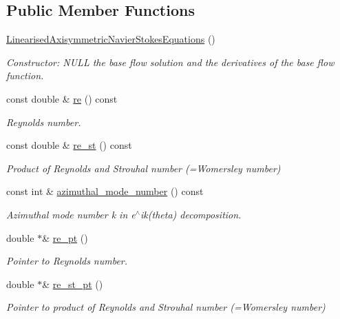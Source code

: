 \subsection*{Public Member Functions}
\begin{DoxyCompactItemize}
\item 
\hyperlink{classoomph_1_1LinearisedAxisymmetricNavierStokesEquations_af5e187cebf7b218c452eeaef0514abfb}{Linearised\+Axisymmetric\+Navier\+Stokes\+Equations} ()
\begin{DoxyCompactList}\small\item\em Constructor\+: N\+U\+LL the base flow solution and the derivatives of the base flow function. \end{DoxyCompactList}\item 
const double \& \hyperlink{classoomph_1_1LinearisedAxisymmetricNavierStokesEquations_a6cbc29fea3dd2d94d546ba123976599d}{re} () const
\begin{DoxyCompactList}\small\item\em Reynolds number. \end{DoxyCompactList}\item 
const double \& \hyperlink{classoomph_1_1LinearisedAxisymmetricNavierStokesEquations_a57172dbe008a3b6889397c64fa9e5172}{re\+\_\+st} () const
\begin{DoxyCompactList}\small\item\em Product of Reynolds and Strouhal number (=Womersley number) \end{DoxyCompactList}\item 
const int \& \hyperlink{classoomph_1_1LinearisedAxisymmetricNavierStokesEquations_ad587b06cece88eaf6e2774b3bee562c8}{azimuthal\+\_\+mode\+\_\+number} () const
\begin{DoxyCompactList}\small\item\em Azimuthal mode number k in e$^\wedge$ik(theta) decomposition. \end{DoxyCompactList}\item 
double $\ast$\& \hyperlink{classoomph_1_1LinearisedAxisymmetricNavierStokesEquations_a13f43efc800161737d7c99e068bf9c91}{re\+\_\+pt} ()
\begin{DoxyCompactList}\small\item\em Pointer to Reynolds number. \end{DoxyCompactList}\item 
double $\ast$\& \hyperlink{classoomph_1_1LinearisedAxisymmetricNavierStokesEquations_aaecf74206254c99d5fbbc242b317b599}{re\+\_\+st\+\_\+pt} ()
\begin{DoxyCompactList}\small\item\em Pointer to product of Reynolds and Strouhal number (=Womersley number) \end{DoxyCompactList}\item 

\end{DoxyCompactItemize}
